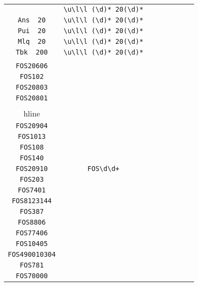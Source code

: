 \begin{longtable}{cccccccc}
\begin{tabular}{ll}
    \verb|Pfd 65 20| & \verb|\u\l\l (\d)* 20(\d)*|\\
\verb|Ans  20| & \verb|\u\l\l (\d)* 20(\d)*|\\
\verb|Pui  20| & \verb|\u\l\l (\d)* 20(\d)*|\\
\verb|Mlq  20| & \verb|\u\l\l (\d)* 20(\d)*|\\
\verb|Tbk  200| & \verb|\u\l\l (\d)* 20(\d)*|
\end{tabular}
\\\midrule 
\begin{tabular}{l}
    \verb|FOS21001|\\
\verb|FOS20606|\\
\verb|FOS102|\\
\verb|FOS20803|\\
\verb|FOS20801|\\
\\hline\\
\verb|FOS20904|\\
\verb|FOS1013|\\
\verb|FOS108|\\
\verb|FOS140|\\
\verb|FOS20910|
\end{tabular}

&
\verb|FOS\d\d+|
&

\begin{tabular}{l}
    \verb|FOS\d\d\d(\d)*|\\
\verb|FOS203|\\
\verb|FOS7401|\\
\verb|FOS8123144|\\
\verb|FOS387|\\
\verb|FOS8806|
\end{tabular}

&

\begin{tabular}{l}
    \verb|FOS\d\d\d(0\d)*|\\
\verb|FOS77406|\\
\verb|FOS10405|\\
\verb|FOS490010304|\\
\verb|FOS781|\\
\verb|FOS70000|
\end{tabular}

&


\end{longtable}
